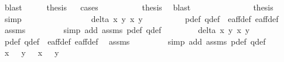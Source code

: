 \begin{isabellebody}
\ blast\isanewline
\ \ \isamarkupfalse%
\ \isamarkupfalse%
\ {\isacharquery}thesis\isanewline
\ \ \isamarkupfalse%
{\isacharparenleft}cases{\isacharparenright}\isanewline
\ \ \ \ \isamarkupfalse%
\ {}\ \isamarkupfalse%
\ \isamarkupfalse%
\ {\isacharquery}thesis\ \isamarkupfalse%
\ blast\ \ \isanewline
\ \ \isamarkupfalse%
\isanewline
\ \ \ \ \isamarkupfalse%
\ {}\ \isamarkupfalse%
\ \isamarkupfalse%
\ {\isacharquery}thesis\ \isamarkupfalse%
\ simp\isanewline
\ \ \isamarkupfalse%
\isanewline
\ \ \ \ \isamarkupfalse%
\ {}\isanewline
\ \ \ \ \isamarkupfalse%
\ \isamarkupfalse%
\ {\isachardoublequoteopen}delta\ x{}\ y{}\ x{}\ y{}\ {\isacharequal}\ {}{\isachardoublequoteclose}\isanewline
\ \ \ \ \ \ \isamarkupfalse%
\ p{\isacharunderscore}def\ q{\isacharunderscore}def\ \ e{\isacharunderscore}aff{\isacharunderscore}{}{\isacharunderscore}def\ e{\isacharunderscore}aff{\isacharunderscore}{}{\isacharunderscore}def\ \isamarkupfalse%
\ assms\ \isanewline
\ \ \ \ \ \ \isamarkupfalse%
\ {\isacharparenleft}simp\ add{\isacharcolon}\ assms\ p{\isacharunderscore}def\ q{\isacharunderscore}def{\isacharparenright}\isanewline
\ \ \ \ \isamarkupfalse%
\ {}\ \isamarkupfalse%
\ {\isachardoublequoteopen}delta{\isacharprime}\ x{}\ y{}\ x{}\ y{}\ {\isacharequal}\ {}{\isachardoublequoteclose}\isanewline
\ \ \ \ \ \ \isamarkupfalse%
\ p{\isacharunderscore}def\ q{\isacharunderscore}def\ \ e{\isacharunderscore}aff{\isacharunderscore}{}{\isacharunderscore}def\ e{\isacharunderscore}aff{\isacharunderscore}{}{\isacharunderscore}def\ \isamarkupfalse%
\ assms\ \isanewline
\ \ \ \ \ \ \isamarkupfalse%
\ {\isacharparenleft}simp\ add{\isacharcolon}\ assms\ p{\isacharunderscore}def\ q{\isacharunderscore}def{\isacharparenright}\isanewline
\ \ \ \ \isamarkupfalse%
\ {\isachardoublequoteopen}x{}\ {\isasymnoteq}\ {}{\isachardoublequoteclose}\ {\isachardoublequoteopen}y{}\ {\isasymnoteq}\ {}{\isachardoublequoteclose}\ {\isachardoublequoteopen}x{}\ {\isasymnoteq}\ {}{\isachardoublequoteclose}\ {\isachardoublequoteopen}y{}\ {\isasymnoteq}\ {}{\isachardoublequoteclose}\ \isanewline

\end{isabellebody}
